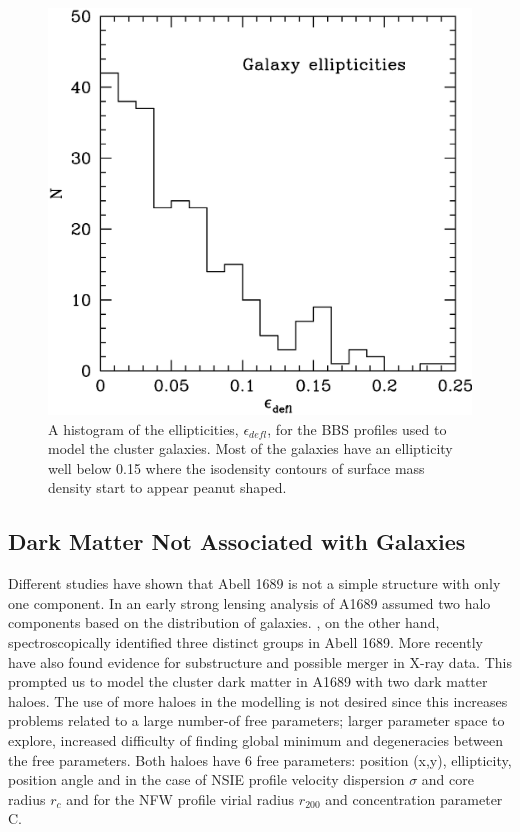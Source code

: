 \documentclass[useAMS,usenatbib]{mn2e}
\newcounter{one}   \setcounter{one}{1}
\newcounter{two}   \setcounter{two}{2}
\newcounter{three} \setcounter{three}{3}
\begin{document}
\begin{figure}
  \centering \includegraphics[height=\columnwidth]{figs/gal_ell.ps}
  \caption{ A histogram of the ellipticities, $\epsilon_{defl}$, for
  the BBS profiles used to model the cluster galaxies. Most of the
  galaxies have an ellipticity well below 0.15 where the isodensity
  contours of surface mass density start to appear peanut shaped.}
  \label{fig:gal_ell}
\end{figure}


\subsection{Dark Matter Not Associated with Galaxies}
\label{sec:DM}
Different studies have shown that Abell 1689 is not a simple structure
with only one component. In an early strong lensing analysis of A1689
\citet{miralda:95} assumed two halo components based on the
distribution of galaxies. \citet{girardi:97}, on the other hand,
spectroscopically identified three distinct groups in Abell 1689. More
recently \citet{andersson:04} have also found evidence for
substructure and possible merger in \mbox{X-ray} data. This prompted
us to model the cluster dark matter in A1689 with two dark matter
haloes. The use of more haloes in the modelling is not desired since
this increases problems related to a large number-of free parameters;
larger parameter space to explore, increased difficulty of finding
global minimum and degeneracies between the free parameters.  Both
haloes have 6 free parameters: position (x,y), ellipticity, position
angle and in the case of NSIE profile velocity dispersion $\sigma$ and
core radius $r_c$ and for the NFW profile virial radius $r_{200}$ and
concentration parameter C.
\end{document}
